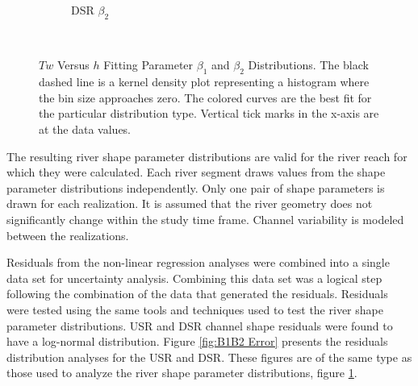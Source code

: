 \begin{linenumbers}
\begin{figure}[htbp]
\begin{subfigure}{0.5\textwidth}
	\caption{DSR $\beta_2$}
\end{subfigure}\\
\caption[$Tw$ Versus $h$ Fitting Parameter $\beta_1$ and $\beta_2$ Distributions.]{$Tw$ Versus $h$ Fitting Parameter $\beta_1$ and $\beta_2$ Distributions.  The black dashed line is a kernel density plot representing a histogram where the bin size approaches zero.  The colored curves are the best fit for the particular distribution type.  Vertical tick marks in the x-axis are at the data values.}
\label{fig:B1B2}
\end{figure}

The resulting river shape parameter distributions are valid for the river reach for which they were calculated.  Each river segment draws values from the shape parameter distributions independently.  Only one pair of shape parameters is drawn for each realization.  It is assumed that the river geometry does not significantly change within the study time frame.  Channel variability is modeled between the realizations.

Residuals from the non-linear regression analyses were combined into a single data set for uncertainty analysis.  Combining this data set was a logical step following the combination of the data that generated the residuals.  Residuals were tested using the same tools and techniques used to test the river shape parameter distributions.  USR and DSR channel shape residuals were found to have a log-normal distribution.  Figure \ref{fig:B1B2 Error} presents the residuals distribution analyses for the USR and DSR.  These figures are of the same type as those used to analyze the river shape parameter distributions, figure \ref{fig:B1B2}.


\end{linenumbers}
